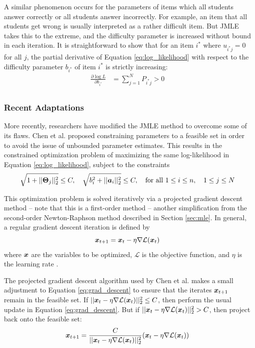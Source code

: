 A similar phenomenon occurs for the parameters of items which all students answer correctly or all students answer incorrectly. For example, an item that all students get wrong is usually interpreted as a rather difficult item. But JMLE takes this to the extreme, and the difficulty parameter is increased without bound in each iteration. It is straightforward to show that for an item $i^*$ where $u_{i^*j} = 0$ for all $j$, the partial derivative of Equation \ref{eq:log_likelihood} with respect to the difficulty parameter $b_{i^*}$ of item $i^*$ is strictly increasing:
\begin{equation}
  \begin{split}
  \frac{\partial \log L}{\partial b_{i^*}} &= \sum_{j=1}^N P_{i^*j}  > 0 \\
  \end{split}
  \label{eq:diff_item_partial}
\end{equation}


\subsubsection{Recent Adaptations}
More recently, researchers have modified the JMLE method to overcome some of its flaws. Chen et al. \cite{chen2019} proposed constraining parameters to a feasible set in order to avoid the issue of unbounded parameter estimates. This results in the constrained optimization problem of maximizing the same log-likelihood in Equation \ref{eq:log_likelihood}, subject to the constraints
\begin{equation}
  \sqrt{1 + ||\boldsymbol{\Theta}_j||_2^2} \leq C, \quad \sqrt{b_i^2 + ||\boldsymbol{a}_i||_2^2} \leq C, \quad \text{for all } 1\leq i \leq n, \quad 1 \leq j \leq N
  \label{eq:cjmle_constraints}
\end{equation}

This optimization problem is solved iteratively via a projected gradient descent method -- note that this is a first-order method -- another simplification from the second-order Newton-Raphson method described in Section \ref{sec:mle}. In general, a regular gradient descent iteration is defined by
\begin{equation}
  \boldsymbol{x}_{t+1} = \boldsymbol{x}_t - \eta \nabla \mathcal{L}(\boldsymbol{x}_t)
  \label{eq:grad_descent}
\end{equation}
where $\boldsymbol{x}$ are the variables to be optimized, $\mathcal{L}$ is the objective function, and $\eta$ is the learning rate \cite{ruder2017}.

The projected gradient descent algorithm used by Chen et al. makes a small adjustment to Equation \ref{eq:grad_descent} to ensure that the iterates $\boldsymbol{x}_{t+1}$ remain in the feasible set. If $||\boldsymbol{x}_t - \eta \nabla \mathcal{L}(\boldsymbol{x}_t)||_2^2 \leq C$, then perform the usual update in Equation \ref{eq:grad_descent}. But if $||\boldsymbol{x}_t - \eta \nabla \mathcal{L}(\boldsymbol{x}_t)||_2^2 > C$, then project back onto the feasible set:
\begin{equation}
  \boldsymbol{x}_{t+1} = \frac{C}{||\boldsymbol{x}_t - \eta \nabla \mathcal{L}(\boldsymbol{x}_t)||_2^2} (\boldsymbol{x}_t - \eta \nabla \mathcal{L}(\boldsymbol{x}_t))
  \label{eq:proj_grad_descent}
\end{equation}

